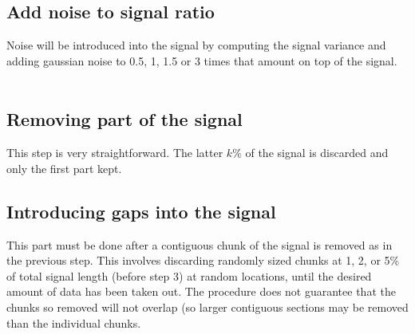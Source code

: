 		\subsection{Add noise to signal ratio}
		Noise will be introduced into the signal by computing the signal variance and adding gaussian noise to 0.5, 1, 1.5 or 3 times that amount on top of the signal. \\ \\
		
		
		
		\subsection{Removing part of the signal}
		This step is very straightforward. The latter $k\%$ of the signal is discarded and only the first part kept.
		
		
		
		\subsection{Introducing gaps into the signal}
		This part must be done after a contiguous chunk of the signal is removed as in the previous step. This involves discarding randomly sized chunks at 1, 2, or 5\% of total signal length (before step 3) at random locations, until the desired amount of data has been taken out. The procedure does not guarantee that the chunks so removed will not overlap (so larger contiguous sections may be removed than the individual chunks.  %
		
		
		
%
